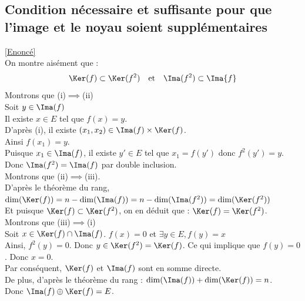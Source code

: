 \documentclass[8pt]{book}
\begin{document}
	\subsection{Condition nécessaire et suffisante pour que l'image et le noyau soient supplémentaires}
	\label{Condition nécessaire et suffisante pour que l'image et le noyau soient supplémentaires corrigé}
	\textcolor{blue}{\hyperref[Condition nécessaire et suffisante pour que l'image et le noyau soient supplémentaires]{[Enoncé]}}\\
	On montre aisément que : $$\Ker(f)\subset \Ker(f^2) \quad \text{et} \quad \Ima(f^2)\subset\Ima{f}$$
	Montrons que (i)$\implies$(ii)\\
	Soit $y\in\Ima(f)$\\
	Il existe $x\in E$ tel que $f(x)=y$.\\
	D'après (i), il existe $(x_1,x_2)\in\Ima(f)\times\Ker(f)$.\\
	Ainsi $f(x_1)=y$.\\
	Puisque $x_1\in \Ima(f)$, il existe $y'\in E$ tel que $x_1=f(y')$ donc $f^2(y')=y$.\\
	Donc $\Ima(f^2)=\Ima(f)$ par double inclusion.\\
	Montrons que (ii)$\implies$(iii).\\
	D'après le théorème du rang, $\dim(\Ker(f))=n-\dim(\Ima(f))=n-\dim(\Ima(f^2))=\dim(\Ker(f^2))$\\
	Et puisque $\Ker(f)\subset\Ker(f^2)$, on en déduit que : $\Ker(f)=\Ker(f^2)$.\\
	Montrons que (iii)$\implies$(i)\\
	Soit $x\in\Ker(f)\cap\Ima(f)$. $f(x)=0$ et	$\exists y\in E, f(y)=x$\\
	Ainsi, $f^2(y)=0$. Donc $y\in\Ker(f^2)=\Ker(f)$. Ce qui implique que $f(y)=0$. Donc $x=0$.\\
	Par conséquent, $\Ker(f)$ et $\Ima(f)$ sont en somme directe.\\
	De plus, d'après le théorème du rang : $\dim(\Ima(f))+\dim(\Ker(f))=n$.\\
	Donc $\Ima(f)\oplus\Ker(f)=E$.
	
\end{document}
